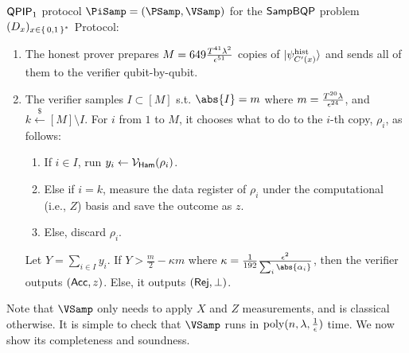 \begin{protocol}{$\operatorname{\mathsf{QPIP}}_1$ protocol $\PiSamp=(\PSamp, \VSamp)$ for the $\operatorname{\mathsf{SampBQP}}$ problem $(D_x)_{x\in\set{0, 1}^*}$}
	Protocol:
	\begin{enumerate}
		\item\label{step:qpip1-state-gen} The honest prover prepares $M=649\frac{T^{41}\lambda^2}{\epsilon^{51}}$ copies of $\ket{\psi_{C'(x)}^{\mathrm{hist}}}$ and sends all of them to the verifier qubit-by-qubit.
		\item\label{step:qpip1-verify} The verifier samples $I\subset[M]$ s.t. $\abs{I}=m$ where $m=\frac{T^{20}\lambda}{\epsilon^{24}}$, and $k\xleftarrow{\$}[M]\setminus I$.
			For $i$ from $1$ to $M$, it chooses what to do to the $i$-th copy, $\rho_i$, as follows:
		\begin{enumerate}
			\item If $i\in I$, run $y_i\leftarrow\mathcal{V}_{\mathsf{Ham}}(\rho_i)$.
			\item Else if $i=k$, measure the data register 
			of $\rho_i$ under the computational (i.e., $Z$) basis and save the outcome as $z$.
			\item Else, discard $\rho_i$.
		\end{enumerate}
			Let $Y=\sum_{i\in I} y_i$. If $Y>\frac{m}{2}-\kappa m$ where $\kappa=\frac{1}{192}\frac{\eps^2}{\sum_i\abs{\alpha_i}}$, then the verifier outputs $(\mathsf{Acc}, z)$.
			Else, it outputs $(\mathsf{Rej}, \bot)$.
	\end{enumerate}
\end{protocol}

Note that $\VSamp$ only needs to apply $X$ and $Z$ measurements, and is classical otherwise.
It is simple to check that $\VSamp$ runs in $\operatorname*{\operatorname{poly}}(n, \lambda, \frac{1}{\epsilon})$ time.
We now show its completeness and soundness.

